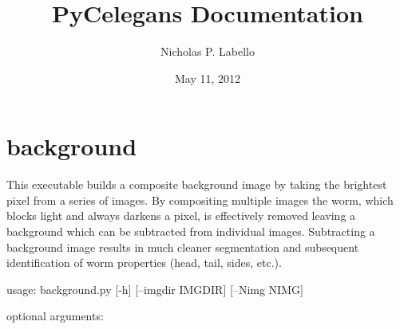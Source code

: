 \documentclass[letterpaper,10pt,oneside]{sphinxmanual}
\title{PyCelegans Documentation}
\date{May 11, 2012}
\author{Nicholas P. Labello}
\begin{document}
\maketitle
\tableofcontents
{}\label{index::doc}

\label{index:module-background}

\chapter{background}
\label{index:background}\label{index:welcome-to-pycelegans-s-documentation}
This executable builds a composite background image by taking the 
brightest pixel from a series of images.  By compositing multiple
images the worm, which blocks light and always darkens a pixel,
is effectively removed leaving a background which can be
subtracted from individual images.  Subtracting a background image
results in much cleaner segmentation and subsequent 
identification of worm properties (head, tail, sides, etc.).

usage: background.py {[}-h{]} {[}--imgdir IMGDIR{]} {[}--Nimg NIMG{]}
\begin{description}
\item[{optional arguments:}] \leavevmode{}

\end{description}
\end{document}

